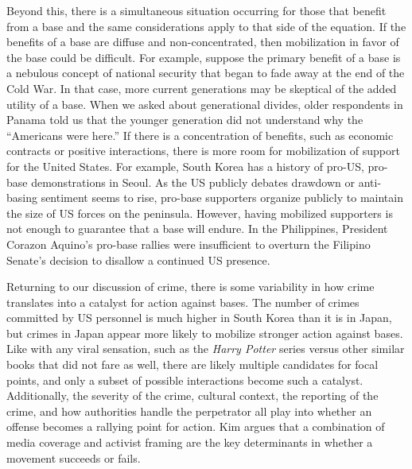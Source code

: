 Beyond this, there is a simultaneous situation occurring for those that benefit from a base and the same considerations apply to that side of the equation. If the benefits of a base are diffuse and non-concentrated, then mobilization in favor of the base could be difficult. For example, suppose the primary benefit of a base is a nebulous concept of national security that began to fade away at the end of the Cold War. In that case, more current generations may be skeptical of the added utility of a base. When we asked about generational divides, older respondents in Panama told us that the younger generation did not understand why the ``Americans were here.''\autocite{journ20180713} If there is a concentration of benefits, such as economic contracts or positive interactions, there is more room for mobilization of support for the United States. For example, South Korea has a history of pro-US, pro-base demonstrations in Seoul. As the US publicly debates drawdown or anti-basing sentiment seems to rise, pro-base supporters organize publicly to maintain the size of US forces on the peninsula. However, having mobilized supporters is not enough to guarantee that a base will endure. In the Philippines, President Corazon Aquino's pro-base rallies were insufficient to overturn the Filipino Senate's decision to disallow a continued US presence.\autocite{Oberdorfer1991,simbulan2009}

Returning to our discussion of crime, there is some variability in how crime translates into a catalyst for action against bases. The number of crimes committed by US personnel is much higher in South Korea than it is in Japan, but crimes in Japan appear more likely to mobilize stronger action against bases.\autocite{Gillem2007} Like with any viral sensation, such as the \textit{Harry Potter} series versus other similar books that did not fare as well, there are likely multiple candidates for focal points, and only a subset of possible interactions become such a catalyst. Additionally, the severity of the crime, cultural context, the reporting of the crime, and how authorities handle the perpetrator all play into whether an offense becomes a rallying point for action. Kim argues that a combination of media coverage and activist framing are the key determinants in whether a movement succeeds or fails.\autocite{kim2017}



